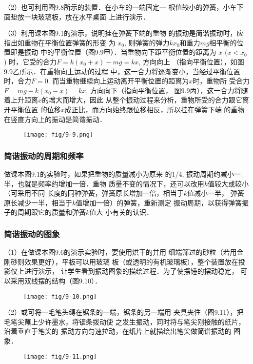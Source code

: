 （2）也可利用图9.8所示的装置．在小车的一端固定一
根值较小的弹簧，小车下面垫放一块玻璃板，放在水平桌面
上进行演示．

（3）利用课本图9.1的演示，说明挂在弹簧下端的重物
的振动是简谐振动时，应指出如重物在平衡位置弹簧的形变
为
$x_0$, 则弹簧的弹力$kx_0$和重力$mg$相平衡的位置即是振动
中的平衡位置（图9.9甲）．当重物向下距平衡位置的距离为
$x$ ($x<x_0$) 时，它受的合力$F=k(x_0+x)-mg=kx$, 方向向上
（指向平衡位置），如图9.9乙所示．在重物向上运动的过程
中，这一合力将逐渐变小，当经过平衡位置时，合力$F=0$.
而当重物继续向上运动离开平衡位置的距离为$x$时，重物所
受合力$F=mg-k(x_0-x)=kx$, 方向向下（指向平衡位置，
图9.9丙），这一合力将随着上升距离$x$的增大而增大，因此
从整个振动过程来分析，重物所受的合力跟它离开平衡位置
的位移$x$成正比，而方向始终跟位移相反，所以挂在弹簧下端
的重物在竖直方向上的振动是简谐振动．

\begin{figure}[htp]
    \centering
    \texttt{[image: fig/9-9.png]}
    \caption{}
\end{figure}

\subsubsection{简谐振动的周期和频率}
做课本图9.1的实验时，如果把重物的质量减小为原来
的1/4, 振动周期约减小一半，也就是频率约增加一倍．重物
质量不变的情况下，还可以改用$k$值较大或较小（可采用不同
长度的同种弹簧，弹簧原长增加一倍，相当于$k$值减小一半，
弹簧原长减少一半，相当于$k$值增加一倍）的弹簧，重新测定
振动周期，以获得弹簧振子的周期跟它的质量和弹簧$k$值大
小有关的认识．


\subsubsection{简谐振动的图象}
（1）在做课本图9.6的演示实验时，要使用烘干的并用
细端筛过的砂粒（若用金刚砂则效果更好），平板可以用玻璃
板（或透明的有机玻璃板），整个装置放在投影仪上进行演示，
让学生看到振动图象的描绘过程．为了使摆锤的摆动稳定，
可以采用双线摆的结构（图9.10）．
\begin{figure}[htp]
    \centering
    \texttt{[image: fig/9-10.png]}
    \caption{}
\end{figure}

（2）或可将一毛笔头缚在锯条的一端，锯条的另一端用
夹具夹住（图9.11），把毛笔尖蘸上少许墨水，将锯条拨动使
之发生振动，同时将与笔尖刚接触的纸片，沿着垂直于笔尖的
振动方向匀速拉动，在纸片上就描绘出笔尖做简谱振动的
图象．
\begin{figure}[htp]
    \centering
    \texttt{[image: fig/9-11.png]}
    \caption{}
\end{figure}

